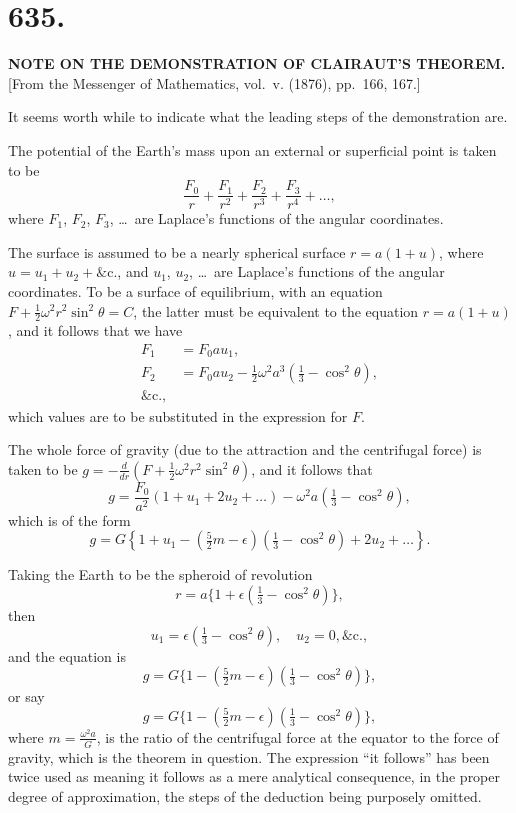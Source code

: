 \documentclass[12pt,a4paper]{article}
\theoremstyle{plain}
\theoremstyle{definition}
\theoremstyle{remark}
\begin{document}
\clearpage
\setcounter{page}{17}

\section*{635.}

\begin{center}
\textbf{NOTE ON THE DEMONSTRATION OF CLAIRAUT'S THEOREM.}\\[1em]
[From the Messenger of Mathematics, vol.~v. (1876), pp.~166, 167.]
\end{center}

It seems worth while to indicate what the leading steps of the demonstration are.

The potential of the Earth's mass upon an external or superficial point is taken to be
\[
\frac{F_0}{r} + \frac{F_1}{r^2} + \frac{F_2}{r^3} + \frac{F_3}{r^4} + \ldots,
\]
where $F_1$, $F_2$, $F_3$, \ldots\ are Laplace's functions of the angular coordinates.

The surface is assumed to be a nearly spherical surface $r = a(1 + u)$, where $u = u_1 + u_2 + \&\text{c.}$, and $u_1$, $u_2$, \ldots\ are Laplace's functions of the angular coordinates. To be a surface of equilibrium, with an equation $F + \frac{1}{2}\omega^2 r^2 \sin^2\theta = C$, the latter must be equivalent to the equation $r = a(1+u)$, and it follows that we have
\begin{align*}
F_1 &= F_0 a u_1, \\
F_2 &= F_0 a u_2 - \tfrac{1}{2}\omega^2 a^3 \left(\tfrac{1}{3} - \cos^2\theta\right), \\
\&\text{c.},
\end{align*}
which values are to be substituted in the expression for $F$.

The whole force of gravity (due to the attraction and the centrifugal force) is taken to be $g = -\frac{d}{dr}\left(F + \frac{1}{2}\omega^2 r^2 \sin^2\theta\right)$, and it follows that
\[
g = \frac{F_0}{a^2}(1 + u_1 + 2u_2 + \ldots) - \omega^2 a \left(\tfrac{1}{3} - \cos^2\theta\right),
\]
which is of the form
\[
g = G\left\{1 + u_1 - \left(\tfrac{5}{2}m - \epsilon\right)\left(\tfrac{1}{3} - \cos^2\theta\right) + 2u_2 + \ldots\right\}.
\]

Taking the Earth to be the spheroid of revolution
\[
r = a\{1 + \epsilon(\tfrac{1}{3} - \cos^2\theta)\},
\]
then
\[
u_1 = \epsilon(\tfrac{1}{3} - \cos^2\theta), \quad u_2 = 0, \&\text{c.},
\]
and the equation is
\[
g = G\{1 - (\tfrac{5}{2}m - \epsilon)(\tfrac{1}{3} - \cos^2\theta)\},
\]
or say
\[
g = G\{1 - (\tfrac{5}{2}m - \epsilon)(\tfrac{1}{3} - \cos^2\theta)\},
\]
where $m = \frac{\omega^2 a}{G}$, is the ratio of the centrifugal force at the equator to the force of gravity, which is the theorem in question. The expression ``it follows'' has been twice used as meaning it follows as a mere analytical consequence, in the proper degree of approximation, the steps of the deduction being purposely omitted.
\end{document}
